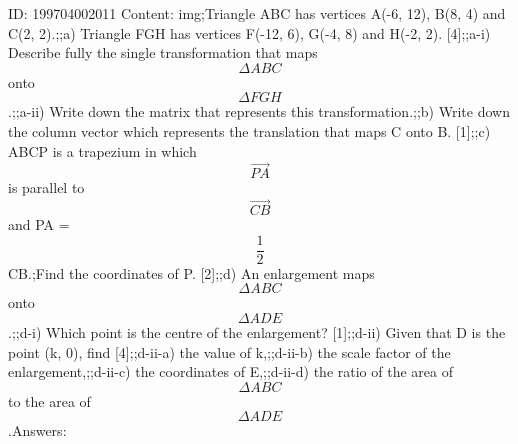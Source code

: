 \documentclass{article}
\begin{document}
ID: 199704002011
Content:
img;Triangle ABC has vertices A(-6, 12), B(8, 4) and C(2, 2).;;a) Triangle FGH has vertices F(-12, 6), G(-4, 8) and H(-2, 2). [4];;a-i) Describe fully the single transformation that maps $$\Delta ABC$$ onto $$\Delta FGH$$.;;a-ii) Write down the matrix that represents this transformation.;;b) Write down the column vector which represents the translation that maps C onto B. [1];;c) ABCP is a trapezium in which $$\vec{PA}$$ is parallel to $$\vec{CB}$$ and PA = $$\frac{1}{2}$$CB.;Find the coordinates of P. [2];;d) An enlargement maps $$\Delta ABC$$  onto $$\Delta ADE$$.;;d-i) Which point is the centre of the enlargement? [1];;d-ii) Given that D is the point (k, 0), find [4];;d-ii-a) the value of k,;;d-ii-b) the scale factor of the enlargement,;;d-ii-c) the coordinates of E,;;d-ii-d) the ratio of the area of $$\Delta ABC$$  to the area of $$\Delta ADE$$.Answers:
\end{document}
